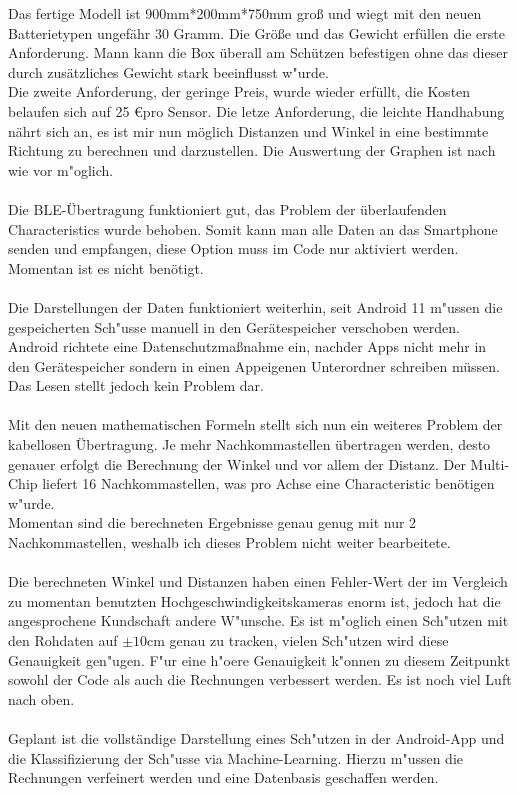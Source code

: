 Das fertige Modell ist 900mm*200mm*750mm groß und wiegt mit den 
neuen Batterietypen ungefähr 30 Gramm. Die Größe und das Gewicht 
erfüllen die erste Anforderung. Mann kann die Box überall am 
Schützen befestigen ohne das dieser durch zusätzliches Gewicht 
stark beeinflusst w"urde.\\
Die zweite Anforderung, der geringe Preis, wurde wieder erfüllt, die
Kosten belaufen sich auf 25 \euro pro Sensor. Die letze Anforderung,
die leichte Handhabung nährt sich an, es ist mir nun möglich Distanzen
und Winkel in eine bestimmte Richtung zu berechnen und darzustellen.
Die Auswertung der Graphen ist nach wie vor m"oglich.\\
\\
Die BLE-Übertragung funktioniert gut, das Problem der überlaufenden
Characteristics wurde behoben. Somit kann man alle Daten an das 
Smartphone senden und empfangen, diese Option muss im Code nur 
aktiviert werden. Momentan ist es nicht benötigt.\\
\\
Die Darstellungen der Daten funktioniert weiterhin, seit Android 11
m"ussen die gespeicherten Sch"usse manuell in den Gerätespeicher 
verschoben werden. Android richtete eine Datenschutzmaßnahme ein, 
nachder Apps nicht mehr in den Gerätespeicher sondern in einen
Appeigenen Unterordner schreiben müssen. Das Lesen stellt jedoch
kein Problem dar.\\
\\
Mit den neuen mathematischen Formeln stellt sich nun ein weiteres
Problem der kabellosen Übertragung. Je mehr Nachkommastellen übertragen
werden, desto genauer erfolgt die Berechnung der Winkel und vor allem 
der Distanz. Der Multi-Chip liefert 16 Nachkommastellen, was pro Achse
eine Characteristic benötigen w"urde.\\
Momentan sind die berechneten Ergebnisse genau genug mit nur 2 
Nachkommastellen, weshalb ich dieses Problem nicht weiter bearbeitete.\\
\\
Die berechneten Winkel und Distanzen haben einen Fehler-Wert der im Vergleich
zu momentan benutzten Hochgeschwindigkeitskameras enorm ist, jedoch 
hat die angesprochene Kundschaft andere W"unsche. Es ist m"oglich 
einen Sch"utzen mit den Rohdaten auf $\pm10$cm genau zu tracken, vielen
Sch"utzen wird diese Genauigkeit gen"ugen. F"ur eine h"oere Genauigkeit 
k"onnen zu diesem Zeitpunkt sowohl der Code als auch die Rechnungen verbessert 
werden. Es ist noch viel Luft nach oben.\\
\\
Geplant ist die vollständige Darstellung eines Sch"utzen in der Android-App
und die Klassifizierung der Sch"usse via Machine-Learning. Hierzu m"ussen
die Rechnungen verfeinert werden und eine Datenbasis geschaffen werden.